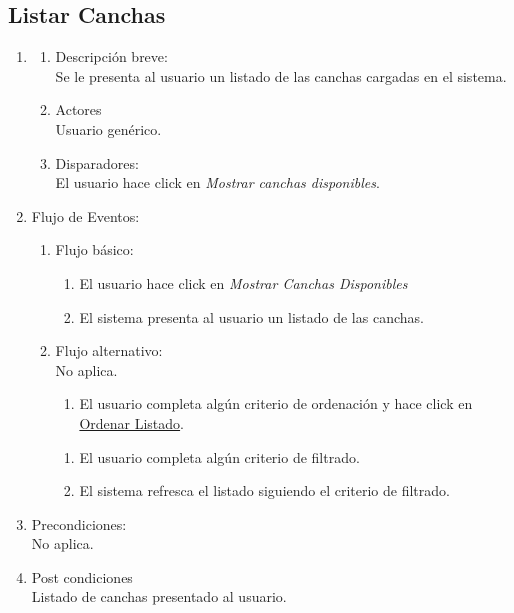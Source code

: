 \documentclass[a4paper,11pt]{article}
\begin{document}
\subsection{Listar Canchas}
\begin{enumerate}

    \item
    \begin{enumerate}
    \item Descripción breve: \\
        Se le presenta al usuario un listado de las canchas cargadas en el sistema.
    \item Actores \\
        Usuario genérico.
    \item Disparadores: \\
        El usuario hace click en \emph{Mostrar canchas disponibles}.
    \end{enumerate}

    \item Flujo de Eventos:

    \begin{enumerate}

        \item Flujo básico:
        \begin{enumerate}
            \item El usuario hace click en \emph{Mostrar Canchas Disponibles}
            \item El sistema presenta al usuario un listado de las canchas.
        \end{enumerate}
        \item Flujo alternativo:\\
            No aplica.
        \begin{enumerate}
                    \item El usuario completa algún criterio de ordenación y
                        hace click en \underline{Ordenar Listado}.
        \end{enumerate}
        \begin{enumerate}
                \item El usuario completa algún criterio de filtrado.
                \item El sistema refresca el listado siguiendo el criterio de filtrado.
        \end{enumerate}
    \end{enumerate}

    \item Precondiciones: \\
        No aplica.

    \item Post condiciones \\
        Listado de canchas presentado al usuario.

\end{enumerate}
\end{document}
